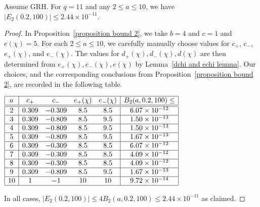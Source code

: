 \documentclass[10pt,a4paper]{amsart}
\begin{document}
\begin{prop} \label{bound E2}
Assume GRH. For $q=11$ and any $2\le a\le 10$, we have $|E_2(0.2,100)| \le 2.44\times 10^{-11}$.
\end{prop}

\begin{proof}
In Proposition~\ref{proposition bound 2},
we take $b=4$ and $c=1$ and $e(\chi)=5$.
For each $2\le a\le10$,
we carefully manually choose values for $c_+$, $c_-$, $e_+(\chi)$, and $e_-(\chi)$. The values for $d_+(\chi),d_-(\chi),d(\chi)$ are then determined from $e_+(\chi),e_-(\chi),e(\chi)$
by Lemma~\ref{dchi and echi lemma}. Our choices, and the corresponding conclusions from Proposition~\ref{proposition bound 2}, are recorded in the following table.
\begin{center}$
\begin{array}{|c | c c c c | c |} 
\hline
a & c_+ & c_- & e_+(\chi) & e_-(\chi) & B_2(a,0.2,100)\le \\
\hline\hline
2 & 0.309 & -0.309 & 8.5 & 8.5 & 6.07\times 10^{-12} \\ 
\hline
3 & 0.309 & -0.809 & 8.5 & 9.5 & 1.50\times 10^{-13} \\ 
\hline
4 & 0.309 & -0.809 & 8.5 & 9.5 & 1.50\times 10^{-13} \\ 
\hline
5 & 0.309 & -0.809 & 8.5 & 9.5 & 1.67\times 10^{-13} \\ 
\hline
6 & 0.309 & -0.309 & 8.5 & 8.5 & 6.07\times 10^{-12} \\ 
\hline
7 & 0.309 & -0.309 & 8.5 & 8.5 & 4.09\times 10^{-12} \\ 
\hline
8 & 0.309 & -0.309 & 8.5 & 8.5 & 4.09\times 10^{-12} \\ 
\hline
9 & 0.309 & -0.809 & 8.5 & 9.5 & 1.67\times 10^{-13} \\ 
\hline
10 & 1 & -1 & 10 & 10 & 9.72\times 10^{-14} \\
\hline
\end{array}
$\end{center}
In all cases, $|E_2(0.2,100)|\le 4B_2(a,0.2,100) \le 2.44\times 10^{-11}$ as claimed.
\end{proof}
\end{document}
